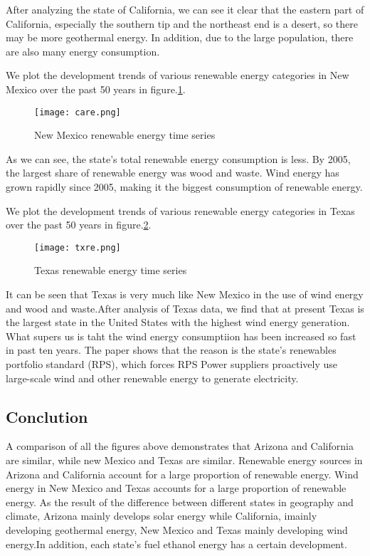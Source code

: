 \documentclass{mcmthesis}
\begin{document}
After analyzing the state of California, we can see it clear that the eastern part of California, especially the southern tip and the northeast end is a desert, so there may be more geothermal energy. In addition, due to the large population, there are also many energy consumption.

We plot the development trends of various renewable energy categories in New Mexico over the past 50 years in figure.\ref{fig: New Mexico renewable energy time series}.
\begin{figure}[htb]
  \centering
  \texttt{[image: care.png]}
  \caption{New Mexico renewable energy time series} \label{fig: New Mexico renewable energy time series}
\end{figure}

As we can see, the state's total renewable energy consumption is less. By 2005, the largest share of renewable energy was wood and waste. Wind energy has grown rapidly since 2005, making it the biggest consumption of renewable energy.

We plot the development trends of various renewable energy categories in Texas over the past 50 years in figure.\ref{fig: Texas renewable energy time series}.
\begin{figure}[htb]
  \centering
  \texttt{[image: txre.png]}
  \caption{Texas renewable energy time series} \label{fig: Texas renewable energy time series}
\end{figure}

It can be seen that Texas is very much like New Mexico in the use of wind energy and wood and waste.After analysis of Texas data, we find that at present Texas is the largest state in the United States with the highest wind energy generation. What supers us is taht the wind energy consumptiion has been increased so fast in past ten years. The paper \cite{Langniss2003The} shows that the reason is the state's renewables portfolio standard (RPS), which forces RPS Power suppliers proactively use large-scale wind and other renewable energy to generate electricity.

\subsection{Conclution}
A comparison of all the figures above demonstrates that Arizona and California are similar, while new Mexico and Texas are similar. Renewable energy sources in Arizona and California account for a large proportion of renewable energy. Wind energy in New Mexico and Texas accounts for a large proportion of renewable energy. As the result of the difference between different states in geography and climate, Arizona mainly develops solar energy while California, imainly developing geothermal energy,  New Mexico and Texas mainly developing wind energy.In addition, each state's fuel ethanol energy has a certain development.
\end{document}
